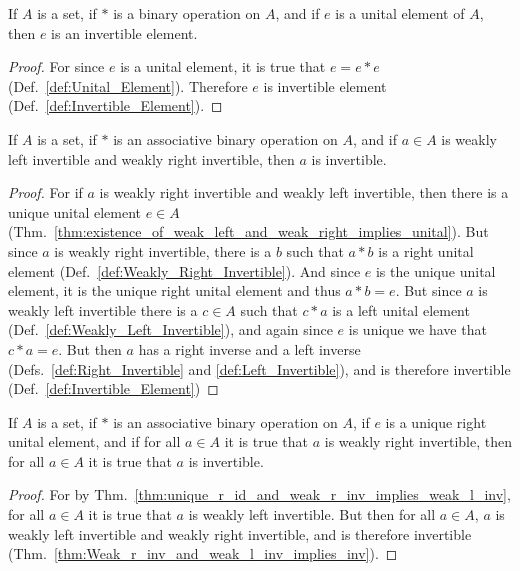     \begin{theorem}
        \label{thm:Unital_Elements_Are_Invertible}%
        If $A$ is a set, if $*$ is a binary operation on $A$, and if $e$ is a
        unital element of $A$, then $e$ is an invertible element.
    \end{theorem}
    \begin{proof}
        For since $e$ is a unital element, it is true that $e=e*e$
        (Def.~\ref{def:Unital_Element}). Therefore $e$ is invertible element
        (Def.~\ref{def:Invertible_Element}).
    \end{proof}
    \begin{theorem}
        \label{thm:Weak_r_inv_and_weak_l_inv_implies_inv}%
        If $A$ is a set, if $*$ is an associative binary operation on $A$, and
        if $a\in{A}$ is weakly left invertible and weakly right invertible, then
        $a$ is invertible.
    \end{theorem}
    \begin{proof}
        For if $a$ is weakly right invertible and weakly left invertible, then
        there is a unique unital element $e\in{A}$
        (Thm.~\ref{thm:existence_of_weak_left_and_weak_right_implies_unital}).
        But since $a$ is weakly right invertible, there is a $b$ such that
        $a*b$ is a right unital element
        (Def.~\ref{def:Weakly_Right_Invertible}). And since $e$ is the unique
        unital element, it is the unique right unital element and thus $a*b=e$.
        But since $a$ is weakly left invertible there is a $c\in{A}$ such that
        $c*a$ is a left unital element (Def.~\ref{def:Weakly_Left_Invertible}),
        and again since $e$ is unique we have that $c*a=e$. But then $a$ has a
        right inverse and a left inverse
        (Defs.~\ref{def:Right_Invertible} and \ref{def:Left_Invertible}), and is
        therefore invertible (Def.~\ref{def:Invertible_Element})
    \end{proof}
    \begin{theorem}
        \label{thm:unqiue_right_unit_and_weak_r_inv_implies_inv}%
        If $A$ is a set, if $*$ is an associative binary operation on $A$, if
        $e$ is a unique right unital element, and if for all $a\in{A}$ it is
        true that $a$ is weakly right invertible, then for all $a\in{A}$ it is
        true that $a$ is invertible.
    \end{theorem}
    \begin{proof}
        For by Thm.~\ref{thm:unique_r_id_and_weak_r_inv_implies_weak_l_inv},
        for all $a\in{A}$ it is true that $a$ is weakly left invertible.
        But then for all $a\in{A}$, $a$ is weakly left invertible and weakly
        right invertible, and is therefore invertible
        (Thm.~\ref{thm:Weak_r_inv_and_weak_l_inv_implies_inv}).
    \end{proof}
